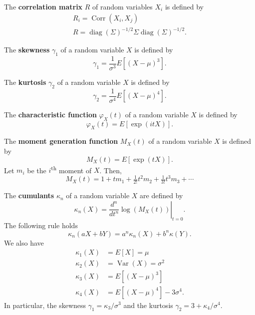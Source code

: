 \documentclass[10pt]{article}
\DeclareMathOperator{\Corr}{Corr}
\DeclareMathOperator{\Var}{Var}
\DeclareMathOperator{\diag}{diag}
\begin{document}
\begin{outline}
\1 The \textbf{correlation matrix} $R$ of random variables $X_i$ is defined by
\begin{gather*}
  R_{i}= \Corr(X_i,X_j)\\
  R = \diag(\Sigma)^{-1/2}\Sigma\diag(\Sigma)^{-1/2}.
\end{gather*}

\1 The \textbf{skewness} $\gamma_1$ of a random variable $X$ is defined by
\begin{equation*}
  \gamma_1 = \frac{1}{\sigma^3}E[(X-\mu)^3].
\end{equation*}

\1 The \textbf{kurtosis} $\gamma_2$ of a random variable $X$ is defined by
\begin{equation*}
  \gamma_2 = \frac{1}{\sigma^4}E[(X-\mu)^4].
\end{equation*}

\1 The \textbf{characteristic function} $\varphi_X(t)$ of a random variable $X$ is defined by
\begin{equation*}
  \varphi_X(t) = E[\exp(itX)].
\end{equation*}

\1 The \textbf{moment generation function} $M_X(t)$ of a random variable $X$ is defined by
\begin{equation*}
  M_X(t) = E[\exp(tX)].
\end{equation*}
Let $m_i$ be the $i$\textsuperscript{th} moment of $X$. Then,
\begin{equation*}
  M_X(t) = 1+tm_1 + \tfrac{1}{2!}t^2m_2 + \tfrac{1}{3!} t^3m_3 + \cdots
\end{equation*}

\1 The \textbf{cumulants} $\kappa_n$ of a random variable $X$ are defined by
\begin{equation*}
  \kappa_n(X) = \left.\frac{d^n}{dt^n}\log(M_X(t))\right\vert_{t=0}.
\end{equation*}
The following rule holds
\begin{equation*}
  \kappa_n(aX + bY) = a^n\kappa_n(X) + b^n\kappa(Y).
\end{equation*}
We also have
\begin{align*}
  \kappa_1(X) &= E[X]=\mu\\
  \kappa_2(X) &= \Var(X) = \sigma^2\\
  \kappa_3(X) &= E[(X-\mu)^3]\\
  \kappa_4(X) &= E[(X-\mu)^4] - 3\sigma^4.
\end{align*}
In particular, the skewness $\gamma_1 = \kappa_3/\sigma^3$ and the kurtosis $\gamma_2 =
3+\kappa_4/\sigma^4$. 
\end{outline}
\end{document}

